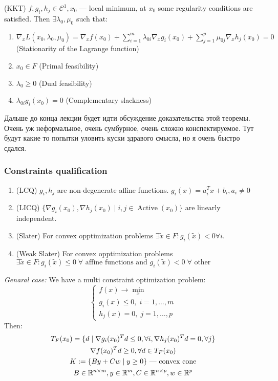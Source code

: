 \begin{theorem} (KKT)
    $f, g_i, h_j \in \mathcal{C}^1, x_0$ --- local minimum, at $x_0$ some regularity conditions are satisfied. Then $\exists \lambda_0, \mu_0$ such that:
    \begin{enumerate}
        \item $\nabla_x L(x_0, \lambda_0, \mu_0) = \nabla_x f(x_0) + \sum_{i=1}^m \lambda_{0i} \nabla_x g_i(x_0) + \sum_{j=1}^p \mu_{0j} \nabla_x h_j(x_0) = 0$ (Stationarity of the Lagrange function)
        \item $x_0 \in F$ (Primal feasibility)
        \item $\lambda_0 \geq 0$ (Dual feasibility)
        \item $\lambda_{0i} g_i(x_0) = 0$ (Complementary slackness)
    \end{enumerate}
\end{theorem}

Дальше до конца лекции будет идти обсуждение доказательства этой теоремы. Очень уж неформальное, очень сумбурное, очень сложно конспектируемое. Тут будут какие то попытки уловить куски здравого смысла, но я очень быстро сдался.

\subsubsection{Constraints qualification}
\begin{enumerate}
    \item (LCQ) $g_i, h_j$ are non-degenerate affine functions. $g_i(x) = a^T_i x + b_i, a_i \neq 0$
    \item (LICQ) $\{ \nabla g_i(x_0), \nabla h_j(x_0) \mid i, j \in \operatorname{Active}(x_0) \}$ are linearly independent.
    \item (Slater) For convex opptimization problems $\exists \tilde{x} \in F : g_i(\tilde{x}) < 0 \forall i$.
    \item (Weak Slater) For convex opptimization problems $\exists \tilde{x} \in F : g_i(\tilde{x}) \leq 0 \; \forall \text{ affine functions and } g_i(\tilde{x}) < 0 \;  \forall \text{ other}$ 
\end{enumerate}

\emph{Genaral case:} 
We have a multi constraint optimization problem: 
\[ 
    \begin{cases}
        f(x) \to \min_x \\ 
        g_i(x) \leq 0, \; i = 1, \ldots, m \\ 
        h_j (x) = 0, \; j = 1, \ldots, p
    \end{cases}
\] 
Then: 
\begin{gather*}
    T_F(x_0) = \{ d \mid \nabla g_i(x_0)^T d \leq 0, \forall i, \nabla h_j(x_0)^T d = 0, \forall j \} \\
    \nabla f (x_0)^T d \geq 0, \forall d \in T_F(x_0) \\ 
    K := \{ B y + C w \mid y \geq 0 \} \text{ --- convex cone} \\
    B \in \mathbb{R}^{n \times m}, y \in \mathbb{R}^m, C \in \mathbb{R}^{n \times p}, w \in \mathbb{R}^p \\
\end{gather*}


